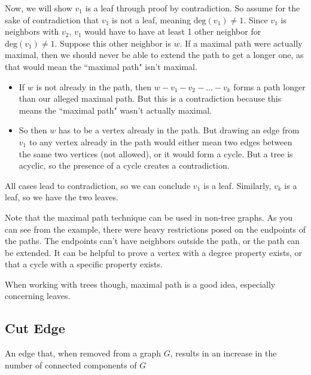 \documentclass[11pt]{scrartcl}
\begin{document}
Now, we will show $v_1$ is a leaf through proof by contradiction. So assume for the sake of contradiction that $v_1$ is not a leaf, meaning $\text{deg}(v_1) \neq 1$. Since $v_1$ is neighbors with $v_2$, $v_1$ would have to have at least 1 other neighbor for $\text{deg}(v_1) \neq 1$. Suppose this other neighbor is $w$. If a maximal path were actually maximal, then we should never be able to extend the path to get a longer one, as that would mean the ``maximal path" isn't maximal.
\begin{itemize}
    \item If $w$ is not already in the path, then $w - v_1 - v_2 - ... - v_k$ forms a path longer than our alleged maximal path. But this is a contradiction because this means the ``maximal path" wasn't actually maximal.
    \item So then $w$ has to be a vertex already in the path. But drawing an edge from $v_1$ to any vertex already in the path would either mean two edges between the same two vertices (not allowed), or it would form a cycle. But a tree is acyclic, so the presence of a cycle creates a contradiction.
\end{itemize}
All cases lead to contradiction, so we can conclude $v_1$ is a leaf. Similarly, $v_k$ is a leaf, so we have the two leaves.

\begin{advice}
    Note that the maximal path technique can be used in non-tree graphs. As you can see from the example, there were heavy restrictions posed on the endpoints of the paths. The endpoints can't have neighbors outside the path, or the path can be extended. It can be helpful to prove a vertex with a degree property exists, or that a cycle with a specific property exists.
\end{advice}

\begin{advice}
    When working with trees though, maximal path is a good idea, especially concerning leaves.
\end{advice}

\subsection{Cut Edge}

\begin{definition}
An edge that, when removed from a graph $G$, results in an increase in the number of connected components of $G$
\end{definition}
\end{document}
